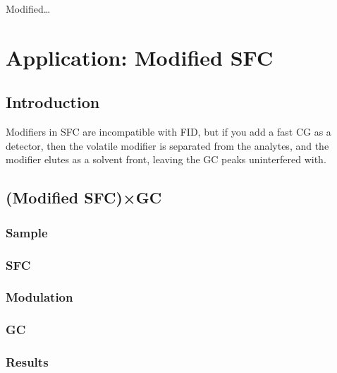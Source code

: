 
\begin{savequote}[45mm]
Modified\ldots
{}
\end{savequote}

\chapter{Application: Modified SFC} %

\label{Chapter7} %


\section{Introduction}

Modifiers in SFC are incompatible with FID, but if you add a fast CG as a
detector, then the volatile modifier is separated from the analytes, and the
modifier elutes as a solvent front, leaving the GC peaks uninterfered with.


\section{(Modified SFC)×GC}

\subsection{Sample}

\subsection{SFC}

\subsection{Modulation}

\subsection{GC}

\subsection{Results}

